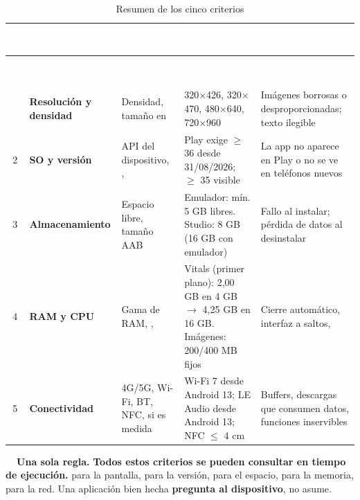 {\footnotesize
\begin{xltabular}{\textwidth}{@{}c >{\RaggedRight\arraybackslash}p{2.2cm} >{\RaggedRight\arraybackslash}p{3.3cm} >{\RaggedRight\arraybackslash}p{3.5cm} >{\RaggedRight\arraybackslash}X@{}}
\caption{Resumen de los cinco criterios}\label{tab:resumen}\\
\toprule
{}
\textcolor{white}{\sffamily\bfseries \#} & \textcolor{white}{\sffamily\bfseries Criterio} & \textcolor{white}{\sffamily\bfseries Dato a mirar} & \textcolor{white}{\sffamily\bfseries Umbral / referencia} & \textcolor{white}{\sffamily\bfseries Si falla, síntoma} \\
\midrule
\endfirsthead
\toprule
{}
\textcolor{white}{\sffamily\bfseries \#} & \textcolor{white}{\sffamily\bfseries Criterio} & \textcolor{white}{\sffamily\bfseries Dato a mirar} & \textcolor{white}{\sffamily\bfseries Umbral / referencia} & \textcolor{white}{\sffamily\bfseries Si falla, síntoma} \\
\midrule
\endhead
\bottomrule
{} & \textbf{Resolución y densidad} & Densidad, tamaño en  &  320$\times$426,  320$\times$470,  480$\times$640,  720$\times$960 & Imágenes borrosas o desproporcionadas; texto ilegible \\
2 & \textbf{SO y versión} & API del dispositivo, ,  & Play exige  $\geq$ 36 desde 31/08/2026; $\geq$ 35 visible & La app no aparece en Play o no se ve en teléfonos nuevos \\
3 & \textbf{Almacenamiento} & Espacio libre, tamaño AAB & Emulador: mín. 5 GB libres. Studio: 8 GB (16 GB con emulador) & Fallo al instalar; pérdida de datos al desinstalar \\
4 & \textbf{RAM y CPU} & Gama de RAM, ,  & Vitals (primer plano): 2,00 GB en 4 GB $\to$ 4,25 GB en 16 GB. Imágenes: 200/400 MB fijos & Cierre automático, interfaz a saltos,  \\
5 & \textbf{Conectividad} & 4G/5G, Wi-Fi, BT, NFC, si es medida & Wi-Fi 7 desde Android 13; LE Audio desde Android 13; NFC $\leq$ 4 cm & Buffers, descargas que consumen datos, funciones inservibles \\
\end{xltabular}
}

\begin{ideabox}
\textbf{\color{mint!70!black}\faLightbulb\ \ Una sola regla.}
\textbf{Todos estos criterios se pueden consultar en tiempo de ejecución.}  para la pantalla,  para la versión,  para el espacio,  para la memoria,  para la red. Una aplicación bien hecha \textbf{pregunta al dispositivo}, no asume.
\end{ideabox}

